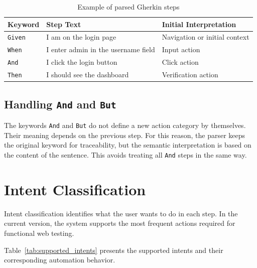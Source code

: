 \begin{table}[H]
	\centering
	\caption{Example of parsed Gherkin steps}
	\label{tab:step_extraction_example}
	\renewcommand{\arraystretch}{1.3}
	\small
	\begin{tabularx}{\textwidth}{|l|X|X|}
		\hline
		\rowcolor{gray!20}
		\textbf{Keyword} & \textbf{Step Text} & \textbf{Initial Interpretation} \\ \hline
		\texttt{Given} & I am on the login page & Navigation or initial context \\ \hline
		\texttt{When} & I enter admin in the username field & Input action \\ \hline
		\texttt{And} & I click the login button & Click action \\ \hline
		\texttt{Then} & I should see the dashboard & Verification action \\ \hline
	\end{tabularx}
\end{table}

\subsection{Handling \texttt{And} and \texttt{But}}
\label{subsec:and_but_steps}

The keywords \texttt{And} and \texttt{But} do not define a new action category by themselves. Their meaning depends on the previous step. For this reason, the parser keeps the original keyword for traceability, but the semantic interpretation is based on the content of the sentence. This avoids treating all \texttt{And} steps in the same way.

\section{Intent Classification}
\label{sec:intent_classification}

Intent classification identifies what the user wants to do in each step. In the current version, the system supports the most frequent actions required for functional web testing.

Table~\ref{tab:supported_intents} presents the supported intents and their corresponding automation behavior.

